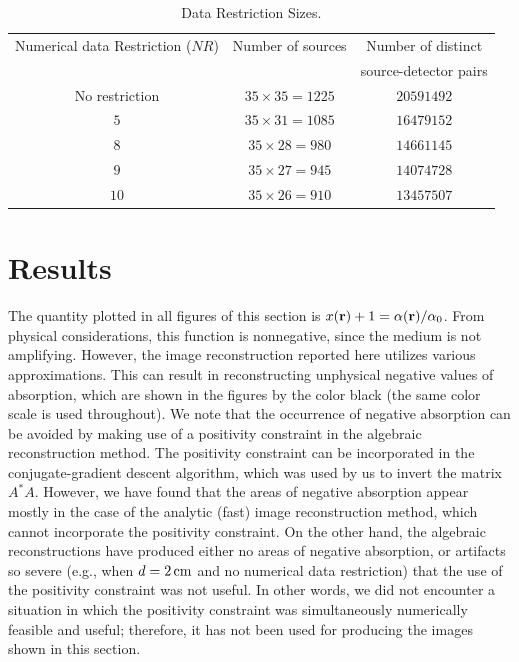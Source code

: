 \begin{table}[t]
\centering\caption{Data Restriction Sizes.}
\begin{tabular}{c|c|c}
\hline 
Numerical data Restriction ($NR$) & Number of sources & 
Number of distinct \\
&& source-detector pairs \\ \hline
No restriction & $35\times35=1225$ & $20591492$ \\
           $5$ & $35\times31=1085$ & $16479152$ \\
           $8$ & $35\times28=980$  & $14661145$ \\
           $9$ & $35\times27=945$  & $14074728$ \\
          $10$ & $35\times26=910$  & $13457507$ \\ \hline
\end{tabular}
\end{table}

\section{Results}
\label{sec:res}

The quantity plotted in all figures of this section is $x({\bf r}) + 1 = \alpha({\bf r}) / \alpha_0$. From physical considerations, this function is nonnegative, since the medium is not amplifying.  However, the image reconstruction reported here utilizes various approximations. This can result in reconstructing unphysical negative values of absorption, which are shown in the figures by the color black (the same color scale is used throughout). We note that the
occurrence of negative absorption can be avoided by making use of a positivity constraint in the algebraic reconstruction method. The positivity constraint can be incorporated in the conjugate-gradient descent algorithm, which was used by us to invert the matrix $A^*A$. However, we have found that the areas of negative absorption appear mostly in the case of the analytic (fast) image reconstruction method, which cannot incorporate the positivity constraint. On the other hand, the algebraic reconstructions have produced either no areas of negative absorption, or artifacts so severe (e.g., when $d=2\,{\rm
  cm}$ and no numerical data restriction) that the use of the positivity constraint was not useful. In other words, we did not encounter a situation in which the positivity constraint was simultaneously numerically feasible and useful; therefore, it has not been used for producing the images shown in this section.

